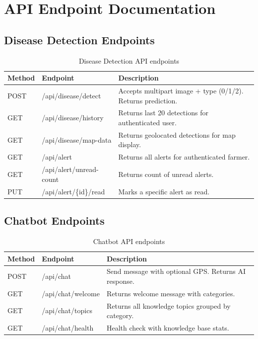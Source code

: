 \newpage


\chapter{API Endpoint Documentation}

\section{Disease Detection Endpoints}

\begin{table}[H]
\centering
\caption{Disease Detection API endpoints}
\begin{tabularx}{\textwidth}{|l|l|X|}
\hline
\textbf{Method} & \textbf{Endpoint} & \textbf{Description} \\
\hline
POST & /api/disease/detect & Accepts multipart image + type (0/1/2). Returns prediction. \\
\hline
GET & /api/disease/history & Returns last 20 detections for authenticated user. \\
\hline
GET & /api/disease/map-data & Returns geolocated detections for map display. \\
\hline
GET & /api/alert & Returns all alerts for authenticated farmer. \\
\hline
GET & /api/alert/unread-count & Returns count of unread alerts. \\
\hline
PUT & /api/alert/\{id\}/read & Marks a specific alert as read. \\
\hline
\end{tabularx}
\end{table}

\section{Chatbot Endpoints}

\begin{table}[H]
\centering
\caption{Chatbot API endpoints}
\begin{tabularx}{\textwidth}{|l|l|X|}
\hline
\textbf{Method} & \textbf{Endpoint} & \textbf{Description} \\
\hline
POST & /api/chat & Send message with optional GPS. Returns AI response. \\
\hline
GET & /api/chat/welcome & Returns welcome message with categories. \\
\hline
GET & /api/chat/topics & Returns all knowledge topics grouped by category. \\
\hline
GET & /api/chat/health & Health check with knowledge base stats. \\
\hline
\end{tabularx}
\end{table}

